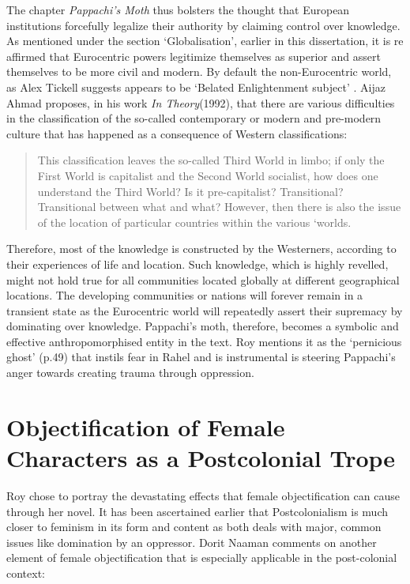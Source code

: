 The chapter \emph{Pappachi's Moth} thus bolsters the thought that European institutions forcefully legalize their authority by claiming control over knowledge. As mentioned under the section `Globalisation', earlier in this dissertation, it is re affirmed that Eurocentric powers legitimize themselves as superior and assert themselves to be more civil and modern. By default the non-Eurocentric world, as Alex Tickell suggests appears to be `Belated Enlightenment subject' \parencite{Tickell2006}. Aijaz Ahmad proposes, in his work \emph{In Theory}(1992), that there are various difficulties in the classification of the so-called contemporary or modern and pre-modern culture that has happened as a consequence of Western classifications: 

\begin{quote}
  This classification leaves the so-called Third World in limbo; if only the First World is capitalist and the Second World socialist, how does one understand the Third World? Is it pre-capitalist? Transitional? Transitional between what and what? However, then there is also the issue of the location of particular countries within the various `worlds. \parencite[100]{Ahmad1994}
\end{quote}

Therefore, most of the knowledge is constructed by the Westerners, according to their experiences of life and location. Such knowledge, which is highly revelled, might not hold true for all communities located globally at different geographical locations. The developing communities or nations will forever remain in a transient state as the Eurocentric world will repeatedly assert their supremacy by dominating over knowledge. Pappachi's moth, therefore, becomes a symbolic and effective anthropomorphised entity in the text. Roy mentions it as the `pernicious ghost' (p.49) that instils fear in Rahel and is instrumental is steering Pappachi's anger towards creating trauma through oppression.

\section{Objectification of Female Characters as a Postcolonial Trope}

Roy chose to portray the devastating effects that female objectification can cause through her novel. It has been ascertained earlier that Postcolonialism is much closer to feminism in its form and content as both deals with major, common issues like domination by an oppressor. Dorit Naaman comments on another element of female objectification that is especially applicable in the post-colonial context:


